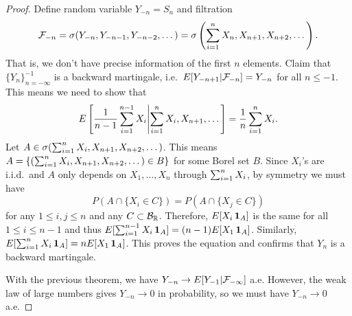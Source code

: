 \documentclass[a4paper]{article}
\begin{document}
\begin{proof}
  Define random variable $Y_{-n} = S_n$ and filtration
  \[
    \mathcal{F}_{-n} = \sigma(Y_{-n}, Y_{-n-1}, Y_{-n-2}, \dots) =
    \sigma \left( \sum_{i=1}^n X_n, X_{n + 1}, X_{n + 2}, \dots \right).
  \]
  That is, we don't have precise information of the first $n$
  elements. Claim that
  $\{ Y_n \}_{n = -\infty}^{-1}$ is a backward martingale, i.e.\
  $E [ Y_{- n + 1} | \mathcal{F}_{-n} ] = Y_{-n}$ for all $n \leq -1$.
  This means we need to show that
  \begin{align*}
    E \left[ \frac{1}{n - 1} \sum_{i=1}^{n - 1} X_i
        \middle| \sum_{i=1}^n X_i, X_{n + 1}, \dots \right] = \frac{1}{n} \sum_{i=1}^n X_i.
  \end{align*}
  Let $A \in \sigma (\sum_{i=1}^n X_i, X_{n + 1}, X_{n + 2}, \dots)$.
  This means $A = \{ (\sum_{i=1}^n X_i, X_{n + 1}, X_{n + 2}, \dots)
    \in B \}$ for some Borel set $B$. Since $X_i$'s are i.i.d.\
  and $A$ only depends on $X_1, \dots, X_n$ through
  $\sum_{i=1}^n X_i$, by symmetry we must have
  \[
    P (A \cap \{ X_i \in C \}) = P(A \cap \{ X_j \in C \})
  \]
  for any $1 \leq i,j \leq n$ and any $C \subset \mathcal{B}_{\mathbb{R}}$.
  Therefore, $E [X_i \operatorname{\mathbf{1}}_A]$ is the same for all $1 \leq i \leq n - 1$
  and thus $E [\sum_{i=1}^{n-1} X_i \operatorname{\mathbf{1}}_A] = (n - 1) E [X_1 \operatorname{\mathbf{1}}_A]$. Similarly,
  $E [\sum_{i=1}^n X_i \operatorname{\mathbf{1}}_A] = n E[X_1 \operatorname{\mathbf{1}}_A]$. This proves the equation
  and confirms that $Y_n$ is a backward martingale.

  With the previous theorem, we have $Y_{-n} \to E[Y_{-1} | \mathcal{F}_{-\infty}]$
  a.e. However, the weak law of large numbers gives $Y_{-n} \to 0$
  in probability, so we must have $Y_{-n} \to 0$ a.e.

\end{proof}
\end{document}

